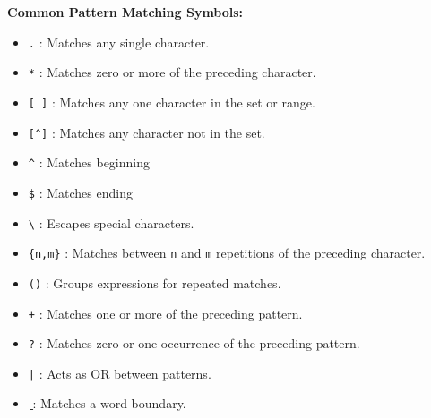 \documentclass[a4paper,12pt=]{article}
\begin{document}
\textbf{Common Pattern Matching Symbols:}
    \begin{itemize}
        \item \texttt{.} : Matches any single character.
        \item \texttt{*} : Matches zero or more of the preceding character.
        \item \texttt{[ ]} : Matches any one character in the set or range.
        \item \texttt{[\^{}]} : Matches any character not in the set.
        \item \texttt{\^{}} : Matches beginning
        \item \texttt{\$} : Matches ending
        \item \texttt{\textbackslash} : Escapes special characters.
        \item \texttt{\{n,m\}} : Matches between \texttt{n} and \texttt{m} repetitions of the preceding character.
        \item \texttt{()} : Groups expressions for repeated matches.
        \item \texttt{+} : Matches one or more of the preceding pattern.
        \item \texttt{?} : Matches zero or one occurrence of the preceding pattern.
        \item \texttt{|} : Acts as OR between patterns.
        \item \texttt{\string\b} : Matches a word boundary.
\end{itemize}
\end{document}
